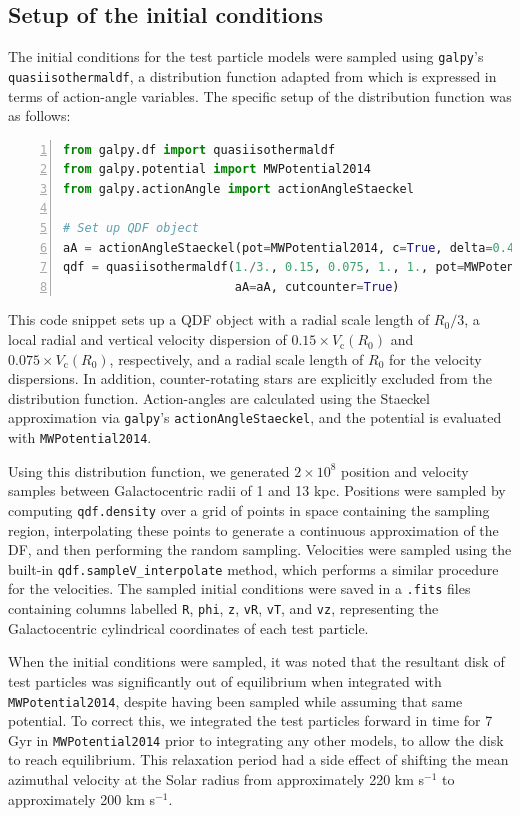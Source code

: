 \documentclass[10pt]{article}
\begin{document}
\subsection{Setup of the initial conditions} \label{init}
The initial conditions for the test particle models were sampled using \texttt{galpy}'s \texttt{quasiisothermaldf}, a distribution function adapted from \textcite{B10} which is expressed in terms of action-angle variables. The specific setup of the distribution function was as follows:
\begin{lstlisting}[language=Python, numbers=left]
from galpy.df import quasiisothermaldf
from galpy.potential import MWPotential2014
from galpy.actionAngle import actionAngleStaeckel

# Set up QDF object
aA = actionAngleStaeckel(pot=MWPotential2014, c=True, delta=0.45)
qdf = quasiisothermaldf(1./3., 0.15, 0.075, 1., 1., pot=MWPotential2014, 
                        aA=aA, cutcounter=True)
\end{lstlisting}
This code snippet sets up a QDF object with a radial scale length of $R_0/3$, a local radial and vertical velocity dispersion of $0.15 \times V_\mathrm{c}(R_0)$ and $0.075 \times V_\mathrm{c}(R_0)$, respectively, and a radial scale length of $R_0$ for the velocity dispersions. In addition, counter-rotating stars are explicitly excluded from the distribution function. Action-angles are calculated using the Staeckel approximation via \texttt{galpy}'s \texttt{actionAngleStaeckel}, and the potential is evaluated with \texttt{MWPotential2014}.

Using this distribution function, we generated $2 \times 10^8$ position and velocity samples between Galactocentric radii of 1 and 13 kpc. Positions were sampled by computing \texttt{qdf.density} over a grid of points in space containing the sampling region, interpolating these points to generate a continuous approximation of the DF, and then performing the random sampling. Velocities were sampled using the built-in \texttt{qdf.sampleV\_interpolate} method, which performs a similar procedure for the velocities. The sampled initial conditions were saved in a \texttt{.fits} files containing columns labelled \texttt{R}, \texttt{phi}, \texttt{z}, \texttt{vR}, \texttt{vT}, and \texttt{vz}, representing the Galactocentric cylindrical coordinates of each test particle.

When the initial conditions were sampled, it was noted that the resultant disk of test particles was significantly out of equilibrium when integrated with \texttt{MWPotential2014}, despite having been sampled while assuming that same potential. To correct this, we integrated the test particles forward in time for 7 Gyr in \texttt{MWPotential2014} prior to integrating any other models, to allow the disk to reach equilibrium. This relaxation period had a side effect of shifting the mean azimuthal velocity at the Solar radius from approximately 220 km s$^{-1}$ to approximately 200 km s$^{-1}$.
 
\end{document}
